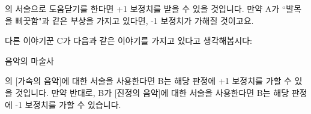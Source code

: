 \documentclass{report}
\begin{document}
	의 서술으로 도움닫기를 한다면 +1 보정치를 받을 수 있을 것입니다. 만약 A가 ``발목을 삐끗함"과 같은 부상을 가지고 있다면, -1 보정치가 가해질 것이고요.
	
	다른 이야기꾼 C가 다음과 같은 이야기를 가지고 있다고 생각해봅시다:
	\begin{lite}{음악의 마술사}
		
	\end{lite}
	
	의 [가속의 음악]에 대한 서술을 사용한다면 B는 해당 판정에 +1 보정치를 가할 수 있을 것입니다. 만약 반대로, B가 [진정의 음악]에 대한 서술을 사용한다면 B는 해당 판정에 -1 보정치를 가할 수 있습니다.
\end{document}
